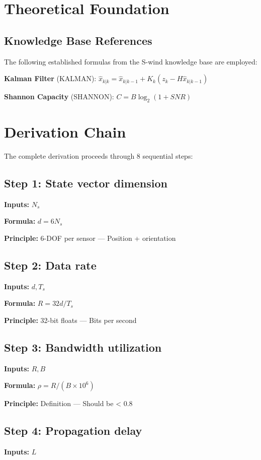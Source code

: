 \documentclass[11pt,twocolumn]{article}
\begin{document}
\section{Theoretical Foundation}

\subsection{Knowledge Base References}
The following established formulas from the S-wind knowledge base are employed:

\textbf{Kalman Filter} (KALMAN): $\hat{x}_{k|k} = \hat{x}_{k|k-1} + K_k(z_k - H\hat{x}_{k|k-1})$ \cite{Kalman}

\textbf{Shannon Capacity} (SHANNON): $C = B\log_2(1+SNR)$ \cite{Shannon}


\section{Derivation Chain}

The complete derivation proceeds through 8 sequential steps:

\subsection*{Step 1: State vector dimension}
\textbf{Inputs:} $N_s$

\textbf{Formula:} $d = 6 N_s$

\textbf{Principle:} 6-DOF per sensor --- Position + orientation

\subsection*{Step 2: Data rate}
\textbf{Inputs:} $d, T_s$

\textbf{Formula:} $R = 32d/T_s$

\textbf{Principle:} 32-bit floats --- Bits per second

\subsection*{Step 3: Bandwidth utilization}
\textbf{Inputs:} $R, B$

\textbf{Formula:} $\rho = R/(B \times 10^6)$

\textbf{Principle:} Definition --- Should be < 0.8

\subsection*{Step 4: Propagation delay}
\textbf{Inputs:} $L$
\end{document}
